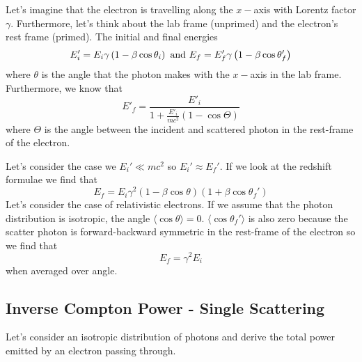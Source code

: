 Let's imagine that the electron is travelling along the $x-$axis with
Lorentz factor $\gamma$.  Furthermore, let's think about the lab frame
(unprimed) and the electron's rest frame (primed).  The initial and
final energies 
\begin{equation}
E_i' = E_i \gamma \left ( 1 - \beta \cos \theta_i \right )~\hbox{\rm and}~
E_f = E_f' \gamma \left ( 1 - \beta \cos \theta_f' \right )
\label{eq:405}
\end{equation}
where $\theta$ is the angle that the photon makes with the $x-$axis in
the lab frame.  Furthermore, we know that
\begin{equation}
E'_f = \frac{E'_i}{1+ \frac{E'_i}{mc^2} \left ( 1 - \cos\Theta \right)}
\label{eq:406}
\end{equation}
where $\Theta$ is the angle between the incident and scattered photon
in the rest-frame of the electron.

Let's consider the case we $E_i' \ll m c^2$ so $E_i' \approx E_f'$.
If we look at the redshift formulae we find that
\begin{equation}
E_f = E_i \gamma^2 \left ( 1 - \beta \cos \theta \right ) \left ( 1 +
\beta \cos \theta_f' \right )
\label{eq:407}
\end{equation}
Let's consider the case of relativistic electrons.  If we assume that
the photon distribution is isotropic, the angle $\langle \cos\theta
\rangle = 0$.  $\langle \cos\theta_f'\rangle$ is also zero because the
scatter photon is forward-backward symmetric in the rest-frame of the
electron so we
find that
\begin{equation}
E_f = \gamma^2 E_i
\label{eq:408}
\end{equation}
when averaged over angle.

\subsection{Inverse Compton Power - Single Scattering}
\label{sec:inverse-compt-power}

Let's consider an isotropic distribution of photons and
derive the total power emitted by an electron passing through. 

